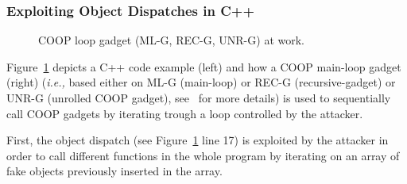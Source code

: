 \subsubsection{Exploiting Object Dispatches in C++}
\label{Exploiting Polymorphism Weaknesses}
 \begin{figure}[!h]
   \vspace{-.37cm}
   \centering
\vspace{-2.6cm}
\caption{COOP loop gadget (ML-G, REC-G, UNR-G) at work.}
\label{Code example used to illustrate how a COOP loop gadget works}
\end{figure}

Figure~\ref{Code example used to illustrate how a COOP loop gadget works}
depicts a C++ code example (left) and how a COOP main-loop gadget (right) 
(\textit{i.e.,} based either on ML-G (main-loop) or REC-G (recursive-gadget) or UNR-G (unrolled COOP gadget), 
see~\cite{crane:readactor++} for more details) is used to sequentially call COOP gadgets by iterating trough 
a loop controlled by the attacker.

First, the object dispatch (see Figure~\ref{Code example used to illustrate how a COOP loop gadget works} line 17) is exploited by the attacker
in order to call different functions in the whole program by iterating on an array of fake objects previously inserted in the array.

